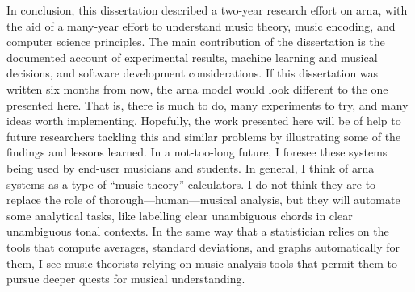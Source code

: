 
In conclusion, this dissertation described a two-year
research effort on \gls{arna}, with the aid of a many-year
effort to understand music theory, music encoding, and
computer science principles. The main contribution of the
dissertation is the documented account of experimental
results, machine learning and musical decisions, and
software development considerations. If this dissertation
was written six months from now, the \gls{arna} model would
look different to the one presented here. That is, there is
much to do, many experiments to try, and many ideas worth
implementing. Hopefully, the work presented here will be of
help to future researchers tackling this and similar
problems by illustrating some of the findings and lessons
learned. In a not-too-long future, I foresee these systems
being used by end-user musicians and students. In general, I
think of \gls{arna} systems as a type of ``music theory''
calculators. I do not think they are to replace the role of
thorough---human---musical analysis, but they will automate
some analytical tasks, like labelling clear unambiguous
chords in clear unambiguous tonal contexts. In the same way
that a statistician relies on the tools that compute
averages, standard deviations, and graphs automatically for
them, I see music theorists relying on music analysis tools
that permit them to pursue deeper quests for musical
understanding. 
